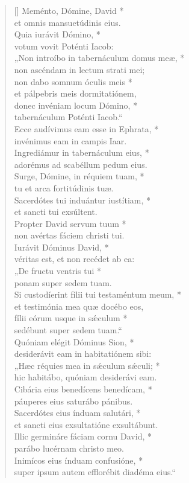 \begin{verse}[\versewidth]
Meménto, Dómine, David *\\
et omnis mansuetúdinis eius.\\
\vin Quia iurávit Dómino, *\\
\vin votum vovit Poténti Iacob:\\
„Non introíbo in tabernáculum domus meæ, *\\
non ascéndam in lectum strati mei;\\
\vin non dabo somnum óculis meis *\\
\vin et pálpebris meis dormitatiónem,\\
donec invéniam locum Dómino, *\\
tabernáculum Poténti Iacob.“\\
\vin Ecce audívimus eam esse in Ephrata, *\\
\vin invénimus eam in campis Iaar.\\
Ingrediámur in tabernáculum eius, *\\
adorémus ad scabéllum pedum eius.\\
\vin Surge, Dómine, in réquiem tuam, *\\
\vin tu et arca fortitúdinis tuæ.\\
Sacerdótes tui induántur iustítiam, *\\
et sancti tui exsúltent.\\
\vin Propter David servum tuum *\\
\vin non avértas fáciem christi tui.\\
Iurávit Dóminus David, *\\
véritas est, et non recédet ab ea:\\
\vin „De fructu ventris tui *\\
\vin ponam super sedem tuam.\\
Si custodíerint fílii tui testaméntum meum, *\\
et testimónia mea quæ docébo eos,\\
\vin fílii eórum usque in s\'{æ}culum *\\
\vin sedébunt super sedem tuam.“\\
Quóniam elégit Dóminus Sion, *\\
desiderávit eam in habitatiónem sibi:\\
\vin „Hæc réquies mea in s\'{æ}culum s\'{æ}culi; *\\
\vin hic habitábo, quóniam desiderávi eam.\\
Cibária eius benedícens benedícam, *\\
páuperes eius saturábo pánibus.\\
\vin Sacerdótes eius índuam salutári, *\\
\vin et sancti eius exsultatióne exsultábunt.\\
Illic germináre fáciam cornu David, *\\
parábo lucérnam christo meo.\\
\vin Inimícos eius índuam confusióne, *\\
\vin super ipsum autem efflorébit diadéma eius.“\\
\end{verse}
\vspace{1cm}


